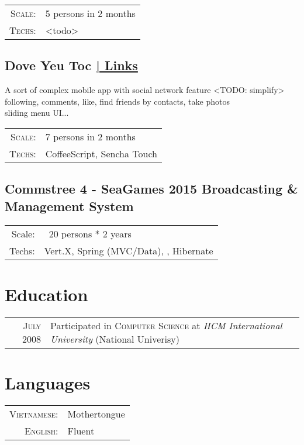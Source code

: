 \documentclass[a4paper,10pt]{article}
\begin{document}
\begin{tabular}{rl}
    \textsc{Scale:} & 5 persons in 2 months\\
    \textsc{Techs:} & <todo>\\
\end{tabular}

\subsection*{Dove Yeu Toc \hfill \hyperlink{dove-links} { | \footnotesize Links}}

A sort of complex mobile app with social network feature <TODO: simplify> following, comments, like, find friends by contacts, take photos\\
sliding menu UI...

\begin{tabular}{rl}
    \textsc{Scale:} & 7 persons in 2 months\\
    \textsc{Techs:} & CoffeeScript, Sencha Touch\\
\end{tabular}

\subsection*{Commstree 4 - SeaGames 2015 Broadcasting \& Management System}
\begin{tabular}{rl}
    Scale: & ~20 persons * 2 years\\
    Techs: & Vert.X, Spring (MVC/Data), , Hibernate
\end{tabular}


\section{Education}
\begin{tabular}{rl}	
    \textsc{July} 2008 & Participated in \textsc{Computer Science} at \textit{HCM International University} (National Univerisy)
\end{tabular}

\section{Languages}
\begin{tabular}{rl}
 \textsc{Vietnamese:}&Mothertongue\\
\textsc{English:}&Fluent\\
\end{tabular}
\end{document}

